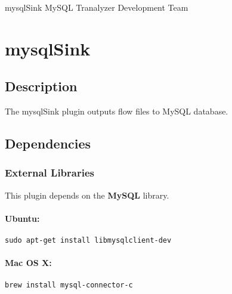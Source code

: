 \documentclass[documentation]{subfiles}
\begin{document}
\trantitle
    {mysqlSink} %
    {MySQL} %
    {Tranalyzer Development Team} %

\section{mysqlSink}\label{s:mysqlSink}

\subsection{Description}
The mysqlSink plugin outputs flow files to MySQL database.

\subsection{Dependencies}

\subsubsection{External Libraries}
This plugin depends on the {\bf MySQL} library.
\paragraph{Ubuntu:} {\tt sudo apt-get install libmysqlclient-dev}
\paragraph{Mac OS X:} {\tt brew install mysql-connector-c}
\end{document}
